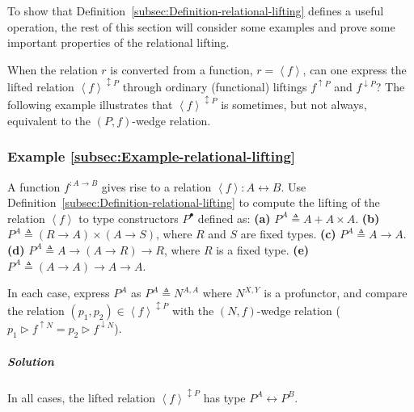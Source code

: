 To show that Definition~\ref{subsec:Definition-relational-lifting}
defines a useful operation, the rest of this section will consider
some examples and prove some important properties of the relational
lifting.

When the relation $r$ is converted from a function, $r=\left<f\right>$,
can one express the lifted relation $\left<f\right>^{\updownarrow P}$
through ordinary (functional) liftings $f^{\uparrow P}$ and $f^{\downarrow P}$?
The following example illustrates that $\left<f\right>^{\updownarrow P}$
is sometimes, but not always, equivalent to the $\left(P,f\right)$-wedge
relation.

\subsubsection{Example \label{subsec:Example-relational-lifting}\ref{subsec:Example-relational-lifting}}

A function $f^{:A\rightarrow B}$ gives rise to a relation $\left<f\right>:A\leftrightarrow B$.
Use Definition~\ref{subsec:Definition-relational-lifting} to compute
the lifting of the relation $\left<f\right>$ to type constructors
$P^{\bullet}$ defined as: \textbf{(a)} $P^{A}\triangleq A+A\times A$.
\textbf{(b)} $P^{A}\triangleq(R\rightarrow A)\times(A\rightarrow S)$,
where $R$ and $S$ are fixed types. \textbf{(c)} $P^{A}\triangleq A\rightarrow A$.
\textbf{(d)} $P^{A}\triangleq A\rightarrow\left(A\rightarrow R\right)\rightarrow R$,
where $R$ is a fixed type. \textbf{(e)} $P^{A}\triangleq\left(A\rightarrow A\right)\rightarrow A\rightarrow A$.

In each case, express $P^{A}$ as $P^{A}\triangleq N^{A,A}$ where
$N^{X,Y}$ is a profunctor, and compare the relation $(p_{1},p_{2})\in\left<f\right>^{\updownarrow P}$
with the $\left(N,f\right)$-wedge relation ($p_{1}\triangleright f^{\uparrow N}=p_{2}\triangleright f^{\downarrow N}$). 

\subparagraph{Solution}

In all cases, the lifted relation $\left<f\right>^{\updownarrow P}$
has type $P^{A}\leftrightarrow P^{B}$.

